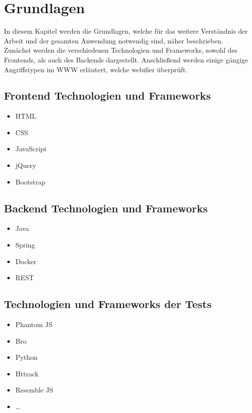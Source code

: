 \chapter{Grundlagen}

In diesem Kapitel werden die Grundlagen, welche für das weitere Verständnis der Arbeit und der gesamten Anwendung notwendig sind, näher beschrieben. Zunächst werden die verschiedenen Technologien und Frameworks, sowohl des Frontends, als auch des Backends dargestellt. Anschließend werden einige gängige Angriffstypen im \ac{WWW} erläutert, welche webifier überprüft.

\section{Frontend Technologien und Frameworks}

\begin{itemize}
    \item HTML
    \item CSS
    \item JavaScript
    \item jQuery
    \item Bootstrap
\end{itemize}

\section{Backend Technologien und Frameworks}


\begin{itemize}
  \item Java
  \item Spring
  \item Docker
  \item REST
\end{itemize}
\section{Technologien und Frameworks der Tests}

\begin{itemize}
    \item Phantom JS
    \item Bro
    \item Python
    \item Httrack
    \item Resemble JS
    \item \ldots
\end{itemize}


